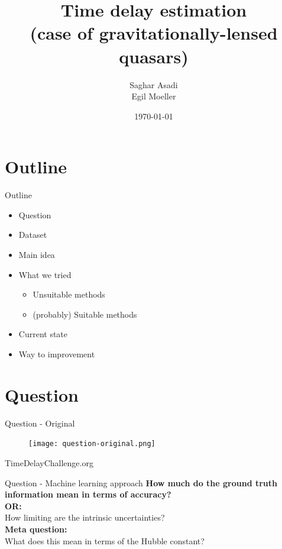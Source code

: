 \documentclass[9pt]{beamer}
\title{Time delay estimation\\{\normalsize (case of gravitationally-lensed quasars)}}
\author{Saghar Asadi\\ Egil Moeller}
\date{\today}
\begin{document}
\maketitle

\section{Outline}

\begin{frame}{Outline}
\begin{itemize}
  \item Question
  \item Dataset
  \item Main idea
  \item What we tried
  \begin{itemize}
    \item Unsuitable methods
    \item (probably) Suitable methods
  \end{itemize}
  \item Current state
  \item Way to improvement
\end{itemize}
\end{frame}

\section{Question}

\begin{frame}{Question - Original}
  \begin{figure}
    \texttt{[image: question-original.png]}
  \end{figure}
  \hspace{0.33\textwidth}TimeDelayChallenge.org
\end{frame}

\begin{frame}{Question - Machine learning approach}
  \textbf{How much do the ground truth information mean in terms of accuracy?}\\
  \vspace{10mm}
  \textbf{OR:}\\
  \normalsize{How limiting are the intrinsic uncertainties?}\\
  \vspace{10mm}
  \textbf{Meta question:}\\
  \normalsize{What does this mean in terms of the Hubble constant?}
\end{frame}
\end{document}
